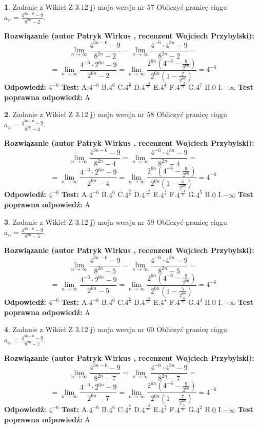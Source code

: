 \documentclass[12pt, a4paper]{article}
\theoremstyle{definition} %
\newtheorem{zad}{}
\newcommand{\zadStart}[1]{\begin{zad}#1\newline}
\newcommand{\zadStop}{\end{zad}}
\newcommand{\rozwStart}[2]{\noindent \textbf{Rozwiązanie (autor #1 , recenzent #2): }\newline}
\newcommand{\rozwStop}{\newline}
\newcommand{\odpStart}{\noindent \textbf{Odpowiedź:}\newline}
\newcommand{\odpStop}{\newline}
\newcommand{\testStart}{\noindent \textbf{Test:}\newline}
\newcommand{\testStop}{\newline}
\newcommand{\kluczStart}{\noindent \textbf{Test poprawna odpowiedź:}\newline}
\newcommand{\kluczStop}{\newline}
\begin{document}
\zadStart{Zadanie z Wikieł Z 3.12 j) moja wersja nr 57}
Obliczyć granicę ciągu $a_{n}=\frac{4^{3n-6}-9}{8^{2n}-2}$.
\zadStop
\rozwStart{Patryk Wirkus}{Wojciech Przybylski}
$$\lim\limits_{n\to\infty}\frac{4^{3n-6}-9}{8^{2n}-2}= \lim\limits_{n\to\infty}\frac{4^{-6} \cdot 4^{3n}-9}{8^{2n}-2}=$$
$$= \lim\limits_{n\to\infty}\frac{4^{-6} \cdot 2^{6n}-9}{2^{6n}-2}= \lim\limits_{n\to\infty}\frac{2^{6n}(4^{-6} - \frac{9}{2^{6n}})}{2^{6n}(1-\frac{2}{2^{6n}})}= 4^{-6}$$
\rozwStop
\odpStart
$4^{-6}$
\odpStop
\testStart
A.$4^{-6}$
B.$4^{6}$
C.$4^{\frac{9}{2}}$
D.$4^{\frac{-9}{2}}$
E.$4^{\frac{2}{9}}$
F.$4^{\frac{-2}{9}}$
G.$4^{7}$
H.$0$
I.$-\infty$
\testStop
\kluczStart
A
\kluczStop



\zadStart{Zadanie z Wikieł Z 3.12 j) moja wersja nr 58}
Obliczyć granicę ciągu $a_{n}=\frac{4^{3n-6}-9}{8^{2n}-4}$.
\zadStop
\rozwStart{Patryk Wirkus}{Wojciech Przybylski}
$$\lim\limits_{n\to\infty}\frac{4^{3n-6}-9}{8^{2n}-4}= \lim\limits_{n\to\infty}\frac{4^{-6} \cdot 4^{3n}-9}{8^{2n}-4}=$$
$$= \lim\limits_{n\to\infty}\frac{4^{-6} \cdot 2^{6n}-9}{2^{6n}-4}= \lim\limits_{n\to\infty}\frac{2^{6n}(4^{-6} - \frac{9}{2^{6n}})}{2^{6n}(1-\frac{4}{2^{6n}})}= 4^{-6}$$
\rozwStop
\odpStart
$4^{-6}$
\odpStop
\testStart
A.$4^{-6}$
B.$4^{6}$
C.$4^{\frac{9}{4}}$
D.$4^{\frac{-9}{4}}$
E.$4^{\frac{4}{9}}$
F.$4^{\frac{-4}{9}}$
G.$4^{5}$
H.$0$
I.$-\infty$
\testStop
\kluczStart
A
\kluczStop



\zadStart{Zadanie z Wikieł Z 3.12 j) moja wersja nr 59}
Obliczyć granicę ciągu $a_{n}=\frac{4^{3n-6}-9}{8^{2n}-5}$.
\zadStop
\rozwStart{Patryk Wirkus}{Wojciech Przybylski}
$$\lim\limits_{n\to\infty}\frac{4^{3n-6}-9}{8^{2n}-5}= \lim\limits_{n\to\infty}\frac{4^{-6} \cdot 4^{3n}-9}{8^{2n}-5}=$$
$$= \lim\limits_{n\to\infty}\frac{4^{-6} \cdot 2^{6n}-9}{2^{6n}-5}= \lim\limits_{n\to\infty}\frac{2^{6n}(4^{-6} - \frac{9}{2^{6n}})}{2^{6n}(1-\frac{5}{2^{6n}})}= 4^{-6}$$
\rozwStop
\odpStart
$4^{-6}$
\odpStop
\testStart
A.$4^{-6}$
B.$4^{6}$
C.$4^{\frac{9}{5}}$
D.$4^{\frac{-9}{5}}$
E.$4^{\frac{5}{9}}$
F.$4^{\frac{-5}{9}}$
G.$4^{4}$
H.$0$
I.$-\infty$
\testStop
\kluczStart
A
\kluczStop



\zadStart{Zadanie z Wikieł Z 3.12 j) moja wersja nr 60}
Obliczyć granicę ciągu $a_{n}=\frac{4^{3n-6}-9}{8^{2n}-7}$.
\zadStop
\rozwStart{Patryk Wirkus}{Wojciech Przybylski}
$$\lim\limits_{n\to\infty}\frac{4^{3n-6}-9}{8^{2n}-7}= \lim\limits_{n\to\infty}\frac{4^{-6} \cdot 4^{3n}-9}{8^{2n}-7}=$$
$$= \lim\limits_{n\to\infty}\frac{4^{-6} \cdot 2^{6n}-9}{2^{6n}-7}= \lim\limits_{n\to\infty}\frac{2^{6n}(4^{-6} - \frac{9}{2^{6n}})}{2^{6n}(1-\frac{7}{2^{6n}})}= 4^{-6}$$
\rozwStop
\odpStart
$4^{-6}$
\odpStop
\testStart
A.$4^{-6}$
B.$4^{6}$
C.$4^{\frac{9}{7}}$
D.$4^{\frac{-9}{7}}$
E.$4^{\frac{7}{9}}$
F.$4^{\frac{-7}{9}}$
G.$4^{2}$
H.$0$
I.$-\infty$
\testStop
\kluczStart
A
\kluczStop
\end{document}
